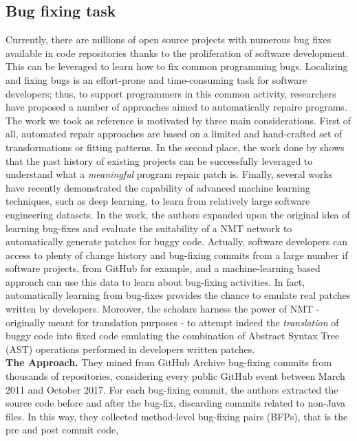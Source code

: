 \subsection{Bug fixing task}
Currently, there are millions of open source projects with numerous bug fixes available in code repositories
thanks to the proliferation of software development. This can be leveraged to learn how to fix common programming bugs. 
Localizing and fixing bugs is an effort-prone and time-consuming task for software developers;
thus, to support programmers in this common activity, researchers have proposed a number of approaches aimed to automatically repaire programs.
The work we took as reference is motivated by three main considerations. 
First of all, automated repair approaches are based on a limited and hand-crafted
set of transformations or fitting patterns. 
In the second place, the work done by \cite{le2016history} shows that the past history of 
existing projects can be successfully leveraged to understand what a \textit{meaningful} program repair patch is. 
Finally, several works have recently demonstrated the capability of advanced machine learning techniques, such as deep learning, to learn from relatively large software engineering
datasets. 
In the work, the authors expanded upon the original idea of learning bug-fixes and evaluate the suitability of a NMT network to automatically
generate patches for buggy code.
Actually, software developers can access to plenty of change history and 
bug-fixing commits from a large number if software projects, from GitHub for example, and
a machine-learning based approach can use this data to learn about 
bug-fixing activities. In fact, automatically learning from bug-fixes provides the 
chance to emulate real patches written by developers. 
Moreover, the scholars harness the power of NMT - originally meant for translation purposes -
to attempt indeed the \textit{translation} of buggy code into fixed code emulating 
the combination of Abstract Syntax Tree (AST) operations performed in developers written patches.\\
\newline
\textbf{The Approach.} They mined from GitHub Archive \cite{grigorik2012github} bug-fixing commits 
from thousands of repositories, considering every public GitHub event between March 2011 and 
October 2017. For each bug-fixing commit, the authors extracted the source code before and 
after the bug-fix, discarding commits related to non-Java files.
In this way, they 
collected method-level bug-fixing pairs (BFPs), that is the pre and post commit code, 
